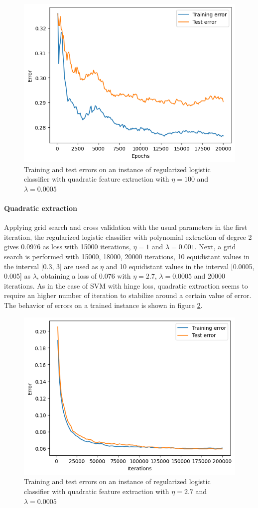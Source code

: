 \documentclass{article}
\begin{document}
\begin{figure}
	\centering
	\includegraphics[width=0.6\columnwidth]{../plots/svm_log.png}
	\caption{Training and test errors on an instance of regularized logistic classifier with quadratic feature extraction with $\eta=100$ and $\lambda=0.0005$}
	\label{fig:svm_log}
\end{figure}
\paragraph{Quadratic extraction}
Applying grid search and cross validation with the usual parameters in the first iteration, the regularized logistic classifier with polynomial extraction of degree 2 gives 0.0976 as loss with 15000 iterations, $\eta=1$ and $\lambda=0.001$. Next, a grid search is performed with 15000, 18000, 20000 iterations, 10 equidistant values in the interval [0.3, 3] are used as $\eta$ and 10 equidistant values in the interval [0.0005, 0.005] as $\lambda$, obtaining a loss of 0.076 with $\eta=2.7$, $\lambda=0.0005$ and 20000 iterations. As in the case of SVM with hinge loss, quadratic extraction seems to require an higher number of iteration to stabilize around a certain value of error. The behavior of errors on a trained instance is shown in figure \ref{fig:quad_svm_log}.
\begin{figure}
	\centering
	\includegraphics[width=0.6\columnwidth]{../plots/quad_svm_log.png}
	\caption{Training and test errors on an instance of regularized logistic classifier with quadratic feature extraction with $\eta=2.7$ and $\lambda=0.0005$}
	\label{fig:quad_svm_log}
\end{figure}
\end{document}
